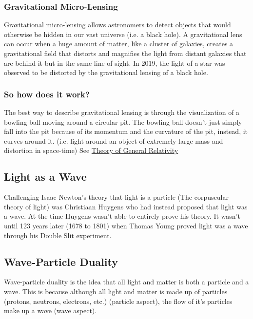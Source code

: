 \documentclass{article}
\begin{document}
\subsubsection{Gravitational Micro-Lensing}
Gravitational micro-lensing allows astronomers to detect objects that would otherwise be hidden in our vast universe (i.e. a black hole). A gravitational lens can occur when a huge amount of matter, like a cluster of galaxies, creates a gravitational field that distorts and magnifies the light from distant galaxies that are behind it but in the same line of sight. In 2019, the light of a star was observed to be distorted by the gravitational lensing of a black hole.

\subsubsection{So how does it work?}
The best way to describe gravitational lensing is through the visualization of a bowling ball moving around a circular pit. The bowling ball doesn't just simply fall into the pit because of its momentum and the curvature of the pit, instead, it curves around it. (i.e. light around an object of extremely large mass and distortion in space-time) See \hyperref[sec:generalrelativity]{Theory of General Relativity}

\subsection{Light as a Wave}
Challenging Isaac Newton's theory that light is a particle (The corpuscular theory of light) was Christiaan Huygens who had instead proposed that light was a wave. At the time Huygens wasn't able to entirely prove his theory. It wasn't until 123 years later (1678 to 1801) when Thomas Young proved light was a wave through his Double Slit experiment.

\subsection{Wave-Particle Duality}
Wave-particle duality is the idea that all light and matter is both a particle and a wave. This is because although all light and matter is made up of particles (protons, neutrons, electrons, etc.) (particle aspect), the flow of it's particles make up a wave (wave aspect).
\end{document}
